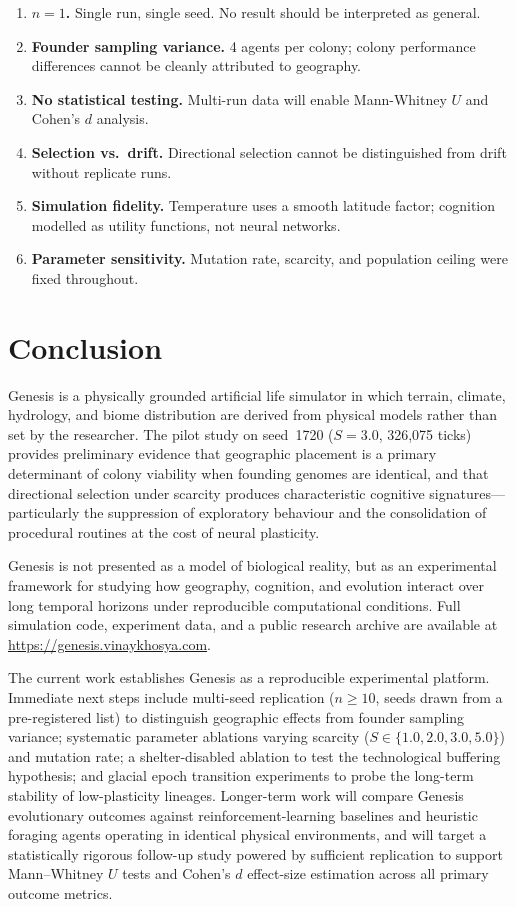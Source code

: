 \documentclass[12pt,a4paper]{article}
\begin{document}
\begin{enumerate}[label=\arabic*.]
  \item \textbf{$n{=}1$.} Single run, single seed. No result should be interpreted as general.
  \item \textbf{Founder sampling variance.} 4 agents per colony; colony performance differences cannot be cleanly attributed to geography.
  \item \textbf{No statistical testing.} Multi-run data will enable Mann-Whitney $U$ and Cohen's $d$ analysis.
  \item \textbf{Selection vs.\ drift.} Directional selection cannot be distinguished from drift without replicate runs.
  \item \textbf{Simulation fidelity.} Temperature uses a smooth latitude factor; cognition modelled as utility functions, not neural networks.
  \item \textbf{Parameter sensitivity.} Mutation rate, scarcity, and population ceiling were fixed throughout.
\end{enumerate}

\section{Conclusion}

Genesis is a physically grounded artificial life simulator in which terrain, climate, hydrology, and biome distribution are derived from physical models rather than set by the researcher. The pilot study on seed~1720 ($S{=}3.0$, 326,075 ticks) provides preliminary evidence that geographic placement is a primary determinant of colony viability when founding genomes are identical, and that directional selection under scarcity produces characteristic cognitive signatures---particularly the suppression of exploratory behaviour and the consolidation of procedural routines at the cost of neural plasticity.

Genesis is not presented as a model of biological reality, but as an experimental framework for studying how geography, cognition, and evolution interact over long temporal horizons under reproducible computational conditions. Full simulation code, experiment data, and a public research archive are available at \url{https://genesis.vinaykhosya.com}.

The current work establishes Genesis as a reproducible experimental platform. Immediate next steps include multi-seed replication ($n \geq 10$, seeds drawn from a pre-registered list) to distinguish geographic effects from founder sampling variance; systematic parameter ablations varying scarcity ($S \in \{1.0, 2.0, 3.0, 5.0\}$) and mutation rate; a shelter-disabled ablation to test the technological buffering hypothesis; and glacial epoch transition experiments to probe the long-term stability of low-plasticity lineages. Longer-term work will compare Genesis evolutionary outcomes against reinforcement-learning baselines and heuristic foraging agents operating in identical physical environments, and will target a statistically rigorous follow-up study powered by sufficient replication to support Mann--Whitney $U$ tests and Cohen's $d$ effect-size estimation across all primary outcome metrics.
\end{document}
